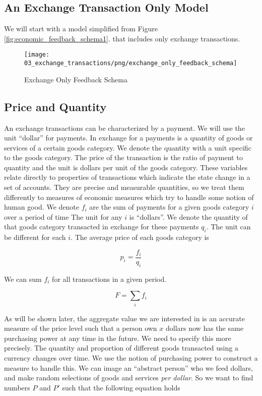 \subsection{An Exchange Transaction Only Model}

We will start with a model simplified from Figure \ref{fig:economic_feedback_schema1}. that includes only
exchange transactions.

\begin{figure}[H]
\centering
\texttt{[image: 03\_exchange\_transactions/png/exchange\_only\_feedback\_schema]}
\caption{Exchange Only Feedback Schema}
\label{fig:exchange_only_feedback_schema1}
\end{figure}

\subsection{Price and Quantity}

An exchange transactions can be characterized by a payment. We will use the unit ``dollar''
for payments. In exchange for a payments is a quantity of goods or services of a certain goods
category. We denote the quantity with a unit specific to the goods category. The price of the
transaction is the ratio of payment to quantity and the unit is dollars per unit of the goods
category. These variables relate directly to properties of transactions which indicate the state
change in a set of accounts. They are precise and measurable quantities, so we treat them
differently to measures of economic measures which try to handle some notion of human good. We
denote $f_i$ are the sum of payments for a given goods category $i$ over a period of time The unit
for any $i$ is ``dollars''. We denote the quantity of that goods category transacted in
exchange for these payments $q_i$. The unit can be different for each $i$. The average price of each
goods category is 

\[
    p_i = \frac {f_i} {q_i}
\]

We can sum $f_i$ for all transactions in a given period.

\begin{equation}\label{equation:f}
    F = \sum_i f_i
\end{equation}

As will be shown later, the aggregate value we are interested in is an accurate measure of the price
level such that a person own $x$ dollars now has the same purchasing power at any time in the
future. We need to specify this more precisely. The quantity and proportion of different goods
transacted using a currency changes over time. We use the notion of purchasing power to construct a
measure to handle this. We can image an ``abstract person'' who we feed dollars, and make random
selections of goods and services \textit{per dollar}.  So we want to find numbers $P$ and $P'$ such
that the following
equation holds

